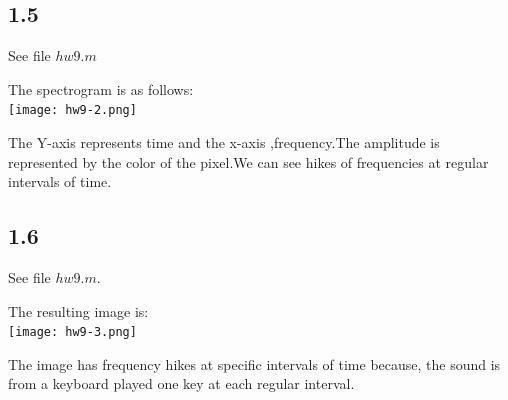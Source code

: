 \documentclass[12pt]{article}
\begin{document}
\subsection*{1.5}
See file $hw9.m$

The spectrogram is as follows:\\

\texttt{[image: hw9-2.png]}

The Y-axis represents time and the x-axis ,frequency.The amplitude is represented by the color of the pixel.We can see hikes of frequencies at regular intervals of time.

\subsection*{1.6}
See file $hw9.m$.

The resulting image is:\\
\texttt{[image: hw9-3.png]}

The image has frequency hikes at specific intervals of time because, the sound is from a keyboard played one key at each regular interval.
\end{document}
